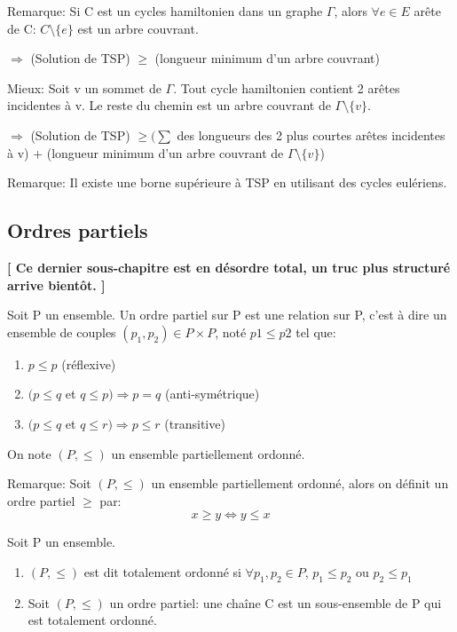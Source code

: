 \begin{exmp}

\end{exmp}


Remarque: Si C est un cycles hamiltonien dans un graphe $\Gamma$, alors $\forall e \in E$ arête de C: $ C \setminus\{e\}$ est un arbre couvrant.

$\Rightarrow$ (Solution de TSP) $\geq$ (longueur minimum d'un arbre couvrant)

Mieux: Soit v un sommet de $\Gamma$. Tout cycle hamiltonien contient 2 arêtes incidentes à v. Le reste du chemin est un arbre couvrant de $\Gamma \setminus\{v\}$.

$\Rightarrow$ (Solution de TSP) $\geq (\sum$ des longueurs des 2 plus courtes arêtes incidentes à v) + (longueur minimum d'un arbre couvrant de $\Gamma \setminus\{v\}$)

Remarque: Il existe une borne supérieure à TSP en utilisant des cycles eulériens. 


\newpage

\subsection{Ordres partiels}

\textbf{ [ Ce dernier sous-chapitre est en désordre total, un truc plus structuré arrive bientôt. ] } 

\begin{defn}
Soit P un ensemble. Un ordre partiel sur P est une relation sur P, c'est à dire un ensemble de couples $(p_{1},p_{2}) \in P\times P$, noté $p{1} \leq p{2}$ tel que:
	\begin{enumerate}
		\item $p \leq p$ (réflexive)
		\item $(p \leq q$ et $q \leq p ) \Rightarrow p = q$ (anti-symétrique)
		\item $(p \leq q$ et $q \leq r ) \Rightarrow p \leq r$ (transitive)
	\end{enumerate}
On note $(P,\leq)$ un ensemble partiellement ordonné.
\end{defn}

Remarque: Soit $(P,\leq)$ un ensemble partiellement ordonné, alors on définit un ordre partiel $\geq$ par: $$x \geq y \Leftrightarrow y \leq x$$

\begin{defn}
Soit P un ensemble.
	\begin{enumerate}
		\item $(P,\leq)$ est dit totalement ordonné si $\forall p_{1},p_{2} \in P$, $p_{1} \leq p_{2}$ ou $p_{2} \leq p_{1}$
		\item Soit $(P,\leq)$ un ordre partiel: une chaîne C est un sous-ensemble de P qui est totalement ordonné.
	\end{enumerate}
\end{defn}

